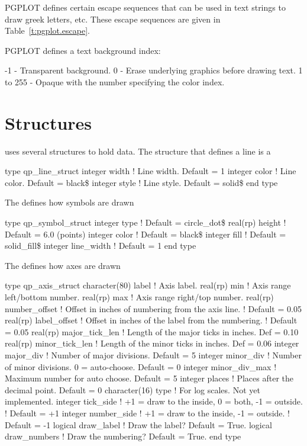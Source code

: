 PGPLOT defines certain escape sequences that can be used in text strings
to draw greek letters, etc. These escape sequences are given in 
Table~\ref{t:pgplot.escape}.

PGPLOT defines a text background index:
\begin{example}
         -1 - Transparent background.
          0 - Erase underlying graphics before drawing text.
   1 to 255 - Opaque with the number specifying the color index.
\end{example}

\section{Structures}
\label{s:qp.structs}

\quickplot uses several structures to hold data. The structure that
defines a line is a 
\begin{example}
  type qp_line_struct
    integer width   ! Line width. Default = 1
    integer color   ! Line color. Default = black\$
    integer style   ! Line style. Default = solid\$
  end type
\end{example}

The  defines how symbols are drawn 
\begin{example}
  type qp_symbol_struct
    integer  type        ! Default = circle_dot\$
    real(rp) height      ! Default = 6.0 (points)
    integer  color       ! Default = black\$
    integer  fill        ! Default = solid_fill\$
    integer  line_width  ! Default = 1
  end type
\end{example}

The  defines how axes are drawn 
\begin{example}
  type qp_axis_struct
    character(80) label       ! Axis label.
    real(rp) min              ! Axis range left/bottom number.
    real(rp) max              ! Axis range right/top number.
    real(rp) number_offset    ! Offset in inches of numbering from the axis line. 
                              !  Default = 0.05
    real(rp) label_offset     ! Offset in inches of the label from the numbering.
                              !  Default = 0.05
    real(rp) major_tick_len   ! Length of the major ticks in inches. Def = 0.10
    real(rp) minor_tick_len   ! Length of the minor ticks in inches. Def = 0.06
    integer major_div         ! Number of major divisions. Default = 5
    integer minor_div         ! Number of minor divisions. 0 = auto-choose. Default = 0
    integer minor_div_max     ! Maximum number for auto choose. Default = 5
    integer places            ! Places after the decimal point. Default = 0
    character(16) type        ! For log scales. Not yet implemented.
    integer tick_side         ! +1 = draw to the inside, 0 = both, -1 = outside.
                              !  Default = +1
    integer number_side       ! +1 = draw to the inside, -1 = outside.
                              !  Default = -1
    logical draw_label        ! Draw the label? Default = True.
    logical draw_numbers      ! Draw the numbering? Default = True.
  end type
\end{example}
